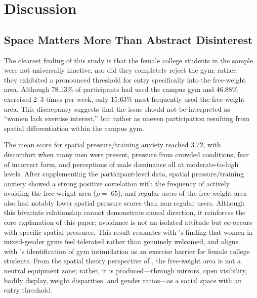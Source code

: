 \section{Discussion}

\subsection{Space Matters More Than Abstract Disinterest}

The clearest finding of this study is that the female college students in the sample were not universally inactive, nor did they completely reject the gym; rather, they exhibited a pronounced threshold for entry specifically into the free-weight area.
Although 78.13\% of participants had used the campus gym and 46.88\% exercised 2--3 times per week, only 15.63\% most frequently used the free-weight area.
This discrepancy suggests that the issue should not be interpreted as ``women lack exercise interest,'' but rather as uneven participation resulting from spatial differentiation within the campus gym.

The mean score for spatial pressure/training anxiety reached 3.72, with discomfort when many men were present, pressure from crowded conditions, fear of incorrect form, and perceptions of male dominance all at moderate-to-high levels.
After supplementing the participant-level data, spatial pressure/training anxiety showed a strong positive correlation with the frequency of actively avoiding the free-weight area ($\rho = .65$), and regular users of the free-weight area also had notably lower spatial pressure scores than non-regular users.
Although this bivariate relationship cannot demonstrate causal direction, it reinforces the core explanation of this paper: avoidance is not an isolated attitude but co-occurs with specific spatial pressures.
This result resonates with \textcite{turnock2021gyms}'s finding that women in mixed-gender gyms feel tolerated rather than genuinely welcomed, and aligns with \textcite{rendall2024gym}'s identification of gym intimidation as an exercise barrier for female college students.
From the spatial theory perspective of \textcite{lefebvre1991production}, the free-weight area is not a neutral equipment zone; rather, it is produced---through mirrors, open visibility, bodily display, weight disparities, and gender ratios---as a social space with an entry threshold.

